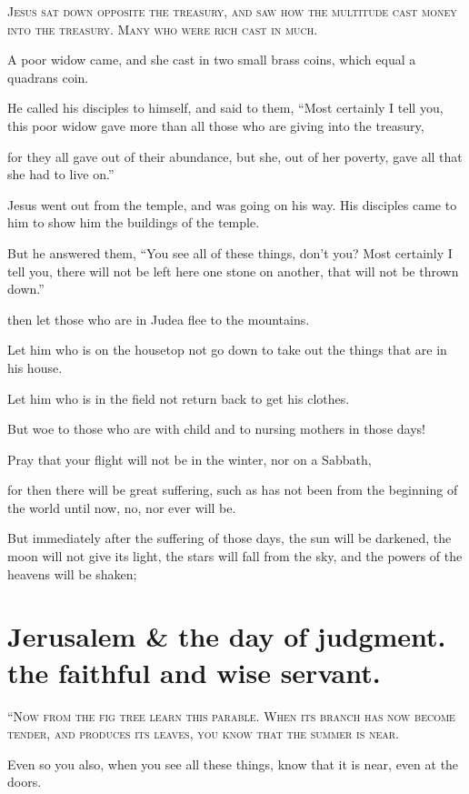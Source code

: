 \lettrine{J}{esus sat down opposite the treasury, and saw how the multitude cast money into the treasury. Many who were rich cast in much.}

A poor widow came, and she cast in two small brass coins, which equal a quadrans coin.

He called his disciples to himself, and said to them, “Most certainly I tell you, this poor widow gave more than all those who are giving into the treasury,

for they all gave out of their abundance, but she, out of her poverty, gave all that she had to live on.”

Jesus went out from the temple, and was going on his way. His disciples came to him to show him the buildings of the temple.

But he answered them, “You see all of these things, don’t you? Most certainly I tell you, there will not be left here one stone on another, that will not be thrown down.”

then let those who are in Judea flee to the mountains.

Let him who is on the housetop not go down to take out the things that are in his house.

Let him who is in the field not return back to get his clothes.

But woe to those who are with child and to nursing mothers in those days!

Pray that your flight will not be in the winter, nor on a Sabbath,

for then there will be great suffering, such as has not been from the beginning of the world until now, no, nor ever will be.

But immediately after the suffering of those days, the sun will be darkened, the moon will not give its light, the stars will fall from the sky, and the powers of the heavens will be shaken;


\clearpage \section*{Jerusalem \& the day of judgment. the faithful and wise servant.}

\lettrine{“}{Now from the fig tree learn this parable. When its branch has now become tender, and produces its leaves, you know that the summer is near.}

Even so you also, when you see all these things, know that it is near, even at the doors.

